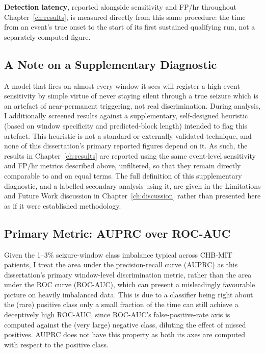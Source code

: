 
\textbf{Detection latency}, reported alongside sensitivity and FP/hr throughout Chapter~\ref{ch:results}, is measured directly from this same procedure: the time from an event's true onset to the start of its first sustained qualifying run, not a separately computed figure.

\subsection{A Note on a Supplementary Diagnostic}

A model that fires on almost every window it sees will register a high event sensitivity by simple virtue of never staying silent through a true seizure which is an artefact of near-permanent triggering, not real discrimination. During analysis, I additionally screened results against a supplementary, self-designed heuristic (based on window specificity and predicted-block length) intended to flag this artefact. This heuristic is not a standard or externally validated technique, and none of this dissertation's primary reported figures depend on it. As such, the results in Chapter~\ref{ch:results} are reported using the same event-level sensitivity and FP/hr metrics described above, unfiltered, so that they remain directly comparable to \citet{ali2024} and \citet{shoeb2009} on equal terms. The full definition of this supplementary diagnostic, and a labelled secondary analysis using it, are given in the Limitations and Future Work discussion in Chapter~\ref{ch:discussion} rather than presented here as if it were established methodology.

\subsection{Primary Metric: AUPRC over ROC-AUC}

Given the 1--3\% seizure-window class imbalance typical across CHB-MIT patients, I treat the area under the precision-recall curve (AUPRC) as this dissertation's primary window-level 
discrimination metric, rather than the area under the ROC curve (ROC-AUC), which can present a misleadingly favourable picture on heavily imbalanced data.
This is due to a classifier being right 
about the (rare) positive class only a small fraction of the time can still achieve a deceptively high ROC-AUC, since ROC-AUC's false-positive-rate axis is computed against the 
(very large) negative class, diluting the effect of missed positives. AUPRC does not have this property as both its axes are computed with respect to the positive class.

